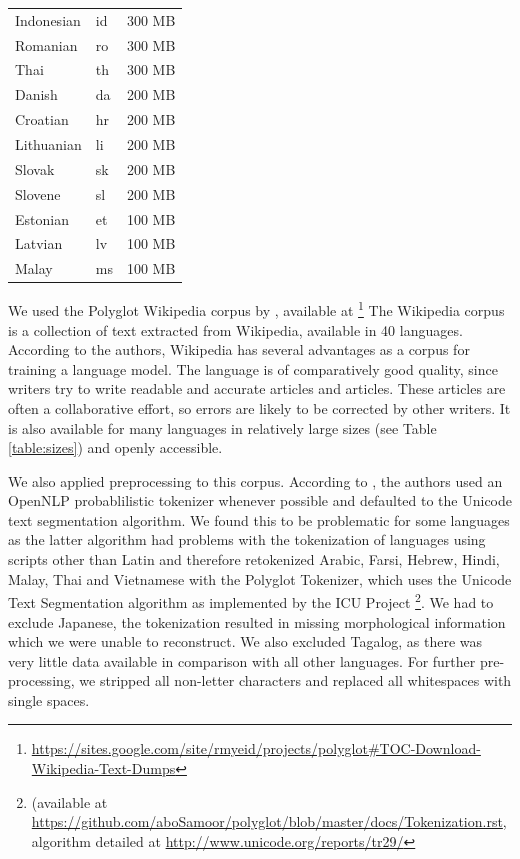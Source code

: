 \documentclass[11pt,a4paper,twoside,openright]{scrbook}
\begin{document}
\begin{table}
\begin{tabular}{|l|l|l|}
        Indonesian & id   & 300 MB \\ 
        Romanian   & ro   & 300 MB \\ 
        Thai       & th   & 300 MB \\ 
        Danish     & da   & 200 MB \\ 
        Croatian   & hr   & 200 MB \\ 
        Lithuanian & li   & 200 MB \\ 
        Slovak     & sk   & 200 MB \\ 
        Slovene    & sl   & 200 MB \\ 
        Estonian   & et   & 100 MB \\ 
        Latvian    & lv   & 100 MB \\ 
        Malay      & ms   & 100 MB \\
        \hline
    \end{tabular}
\end{table}
We used the Polyglot Wikipedia corpus by \citep{polyglot}, available at \footnote{\href{url}{https://sites.google.com/site/rmyeid/projects/polyglot\#TOC-Download-Wikipedia-Text-Dumps}}
The Wikipedia corpus is a collection of text extracted from Wikipedia, available in 40 languages. According to the authors, Wikipedia has several advantages as a corpus for training a language model. The language is of comparatively good quality, since writers try to write readable and accurate articles and articles. These articles are often a collaborative effort, so errors are likely to be corrected by other writers. It is also available for many languages in relatively large sizes (see Table \ref{table:sizes}) and openly accessible. 

We also applied preprocessing to this corpus. According to \citet{polyglot}, the authors used an OpenNLP probablilistic tokenizer whenever possible and defaulted to the Unicode text segmentation algorithm. We found this to be problematic for some languages as the latter algorithm had problems with the tokenization of languages using scripts other than Latin and therefore retokenized Arabic, Farsi, Hebrew, Hindi, Malay, Thai and Vietnamese with the Polyglot Tokenizer, which uses the Unicode Text Segmentation algorithm as implemented by the ICU Project \footnote{(available at \href{url}{https://github.com/aboSamoor/polyglot/blob/master/docs/Tokenization.rst}, algorithm detailed at \href{url}{http://www.unicode.org/reports/tr29/}}. We had to exclude Japanese, the tokenization resulted in missing morphological information which we were unable to reconstruct. We also excluded Tagalog, as there was very little data available in comparison with all other languages. For further pre-processing, we stripped all non-letter characters and replaced all whitespaces with single spaces.
\end{document}
